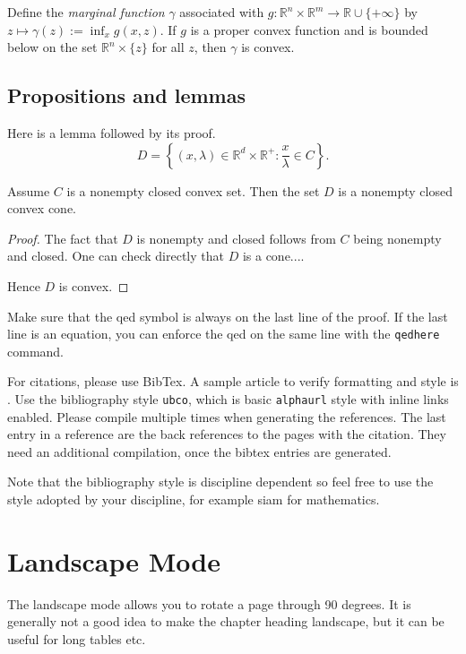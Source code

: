 \documentclass[msc,oneside]{ubcthesis}%
\newcommand{\R}{\mathbb{R}}   %
\begin{document}
\begin{fact}\cite[Theorem~IV.2.4.2]{Hiriart-Urruty:1993-ConvexAnalysis}\label{def:marginalfunc}
Define the \emph{marginal function} $\gamma$ associated with $g:\R^n\times\R^m\rightarrow \R\cup
\{+\infty\}$ by $z\mapsto \gamma(z):=\inf_x
g(x,z)$. If $g$ is a proper convex function and is bounded below on the set  $\R^n \times \{z\}$ for all $z$, then $\gamma$ is convex.
\end{fact}

\section{Propositions and lemmas}
Here is a lemma followed by its proof.
\[
D =\left\{ (x,\lambda)\in \R^d \times \R^+ : \frac{x}{\lambda} \in C\right\}.
\]

\begin{lemma}
Assume $C$ is a nonempty closed convex set. Then the set $D$ is a nonempty closed convex cone.
\end{lemma}

\begin{proof}
The fact that $D$ is nonempty and closed follows from $C$ being non\-empty and closed. One can check directly that $D$ is a cone....

Hence $D$ is convex.
\end{proof}
Make sure that the qed symbol is always on the last line of the proof. If the last line is an equation, you can enforce the qed on the same line with the \texttt{qedhere} command.

For citations, please use BibTex. A sample article to verify formatting and style is \cite{Bauschke:2007-PA02}. Use the bibliography style \texttt{ubco}, which is basic \texttt{alphaurl} style with inline links enabled. Please compile multiple times when generating the references. The last entry in a reference are the back references to the pages with the citation. They need an additional compilation, once the bibtex entries are generated.

Note that the bibliography style is discipline dependent so feel free to use the style adopted by your discipline, for example siam for mathematics.

\chapter{Landscape Mode}
The landscape mode allows you to rotate a page through 90 degrees.  It
is generally not a good idea to make the chapter heading landscape,
but it can be useful for long tables etc.
\end{document}
